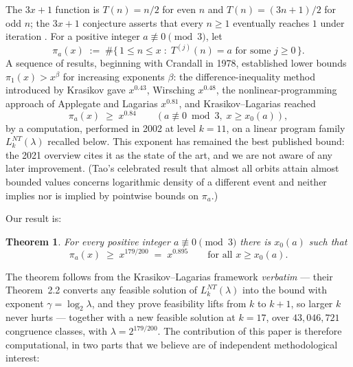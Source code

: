 \documentclass[11pt]{article}
\newtheorem{theorem}{Theorem}[section]
\begin{document}
The $3x+1$ function is
$T(n) = n/2$ for even $n$ and $T(n) = (3n+1)/2$ for odd $n$; the
$3x+1$ conjecture asserts that every $n \ge 1$ eventually reaches $1$
under iteration \cite{lagarias-book, lagarias-overview}. For a positive
integer $a \not\equiv 0 \pmod 3$, let
\[
\pi_a(x) \;:=\; \#\{\, 1 \le n \le x \;:\; T^{(j)}(n) = a
\text{ for some } j \ge 0 \,\}.
\]
A sequence of results, beginning with Crandall \cite{crandall} in 1978,
established lower bounds $\pi_1(x) > x^{\beta}$ for increasing
exponents $\beta$: the difference-inequality method introduced by
Krasikov \cite{krasikov} gave $x^{0.43}$, Wirsching \cite{wirsching}
$x^{0.48}$, the nonlinear-programming approach of Applegate and
Lagarias \cite{applegate-lagarias} $x^{0.81}$, and Krasikov--Lagarias
\cite{kl} reached
\[
\pi_a(x) \;\ge\; x^{0.84}
\qquad (a \not\equiv 0 \bmod 3,\; x \ge x_0(a)),
\]
by a computation, performed in 2002 at level $k = 11$, on a linear
program family $L_k^{NT}(\lambda)$ recalled below. This exponent has
remained the best published bound: the 2021 overview
\cite{lagarias-overview} cites it as the state of the art, and we are
not aware of any later improvement. (Tao's celebrated result that
almost all orbits attain almost bounded values \cite{tao} concerns
logarithmic density of a different event and neither implies nor is
implied by pointwise bounds on $\pi_a$.)

Our result is:

\begin{theorem}\label{thm:main}
For every positive integer $a \not\equiv 0 \pmod 3$ there is
$x_0(a)$ such that
\[
\pi_a(x) \;\ge\; x^{179/200} \;=\; x^{0.895}
\qquad \text{for all } x \ge x_0(a).
\]
\end{theorem}

The theorem follows from the Krasikov--Lagarias framework
\emph{verbatim} --- their Theorem~2.2 converts any feasible solution
of $L_k^{NT}(\lambda)$ into the bound with exponent
$\gamma = \log_2 \lambda$, and they prove feasibility lifts from $k$
to $k+1$, so larger $k$ never hurts --- together with a new feasible
solution at $k = 17$, over $43{,}046{,}721$ congruence classes, with
$\lambda = 2^{179/200}$. The contribution of this paper is therefore
computational, in two parts that we believe are of independent
methodological interest:
\end{document}

